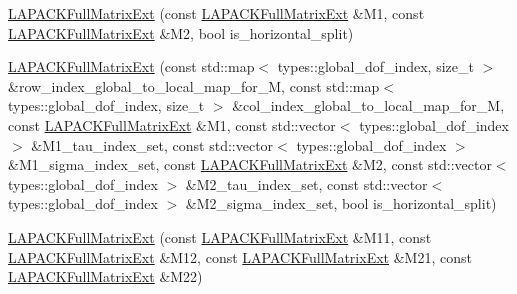\begin{DoxyCompactItemize}
\hyperlink{classLAPACKFullMatrixExt_a98851864591035df275caca76e07ebe3}{L\+A\+P\+A\+C\+K\+Full\+Matrix\+Ext} (const \hyperlink{classLAPACKFullMatrixExt}{L\+A\+P\+A\+C\+K\+Full\+Matrix\+Ext} \&M1, const \hyperlink{classLAPACKFullMatrixExt}{L\+A\+P\+A\+C\+K\+Full\+Matrix\+Ext} \&M2, bool is\+\_\+horizontal\+\_\+split)
\item 
\hyperlink{classLAPACKFullMatrixExt_a1c8c9c59c2edc349031c4867c19067ef}{L\+A\+P\+A\+C\+K\+Full\+Matrix\+Ext} (const std\+::map$<$ types\+::global\+\_\+dof\+\_\+index, size\+\_\+t $>$ \&row\+\_\+index\+\_\+global\+\_\+to\+\_\+local\+\_\+map\+\_\+for\+\_\+M, const std\+::map$<$ types\+::global\+\_\+dof\+\_\+index, size\+\_\+t $>$ \&col\+\_\+index\+\_\+global\+\_\+to\+\_\+local\+\_\+map\+\_\+for\+\_\+M, const \hyperlink{classLAPACKFullMatrixExt}{L\+A\+P\+A\+C\+K\+Full\+Matrix\+Ext} \&M1, const std\+::vector$<$ types\+::global\+\_\+dof\+\_\+index $>$ \&M1\+\_\+tau\+\_\+index\+\_\+set, const std\+::vector$<$ types\+::global\+\_\+dof\+\_\+index $>$ \&M1\+\_\+sigma\+\_\+index\+\_\+set, const \hyperlink{classLAPACKFullMatrixExt}{L\+A\+P\+A\+C\+K\+Full\+Matrix\+Ext} \&M2, const std\+::vector$<$ types\+::global\+\_\+dof\+\_\+index $>$ \&M2\+\_\+tau\+\_\+index\+\_\+set, const std\+::vector$<$ types\+::global\+\_\+dof\+\_\+index $>$ \&M2\+\_\+sigma\+\_\+index\+\_\+set, bool is\+\_\+horizontal\+\_\+split)
\item 
\hyperlink{classLAPACKFullMatrixExt_aa94c466249d0df9e122443c0b6263cf3}{L\+A\+P\+A\+C\+K\+Full\+Matrix\+Ext} (const \hyperlink{classLAPACKFullMatrixExt}{L\+A\+P\+A\+C\+K\+Full\+Matrix\+Ext} \&M11, const \hyperlink{classLAPACKFullMatrixExt}{L\+A\+P\+A\+C\+K\+Full\+Matrix\+Ext} \&M12, const \hyperlink{classLAPACKFullMatrixExt}{L\+A\+P\+A\+C\+K\+Full\+Matrix\+Ext} \&M21, const \hyperlink{classLAPACKFullMatrixExt}{L\+A\+P\+A\+C\+K\+Full\+Matrix\+Ext} \&M22)
\item 

\end{DoxyCompactItemize}
